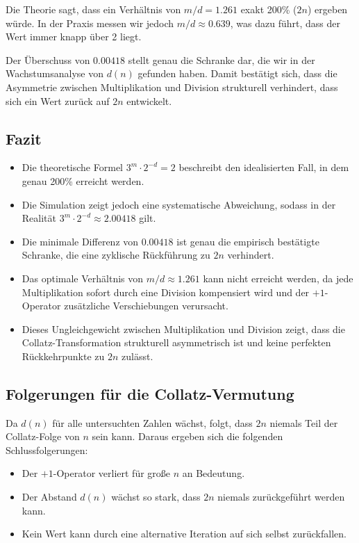 \documentclass[a4paper,12pt]{article}
\begin{document}
Die Theorie sagt, dass ein Verhältnis von \( m/d = 1.261 \) exakt 200\% (\( 2n \)) ergeben würde.  
In der Praxis messen wir jedoch \( m/d \approx 0.639 \), was dazu führt, dass der Wert immer knapp über 2 liegt.  

Der Überschuss von \( 0.00418 \) stellt genau die Schranke dar, die wir in der Wachstumsanalyse von \( d(n) \) gefunden haben. Damit bestätigt sich, dass die Asymmetrie zwischen Multiplikation und Division strukturell verhindert, dass sich ein Wert zurück auf \( 2n \) entwickelt.  

\subsection{Fazit}  

\begin{itemize}
    \item Die theoretische Formel \( 3^m \cdot 2^{-d} = 2 \) beschreibt den idealisierten Fall, in dem genau 200\% erreicht werden.  
    \item Die Simulation zeigt jedoch eine systematische Abweichung, sodass in der Realität \( 3^m \cdot 2^{-d} \approx 2.00418 \) gilt.  
    \item Die minimale Differenz von \( 0.00418 \) ist genau die empirisch bestätigte Schranke, die eine zyklische Rückführung zu \( 2n \) verhindert.  
    \item Das optimale Verhältnis von \( m/d \approx 1.261 \) kann nicht erreicht werden, da jede Multiplikation sofort durch eine Division kompensiert wird und der \( +1 \)-Operator zusätzliche Verschiebungen verursacht.  
    \item Dieses Ungleichgewicht zwischen Multiplikation und Division zeigt, dass die Collatz-Transformation strukturell asymmetrisch ist und keine perfekten Rückkehrpunkte zu \( 2n \) zulässt.  
\end{itemize}




\subsection{Folgerungen für die Collatz-Vermutung}

Da \( d(n) \) für alle untersuchten Zahlen wächst, folgt, dass \( 2n \) niemals Teil der Collatz-Folge von \( n \) sein kann. Daraus ergeben sich die folgenden Schlussfolgerungen:

\begin{itemize}
    \item Der \( +1 \)-Operator verliert für große \( n \) an Bedeutung.
    \item Der Abstand \( d(n) \) wächst so stark, dass \( 2n \) niemals zurückgeführt werden kann.
    \item Kein Wert kann durch eine alternative Iteration auf sich selbst zurückfallen.
\end{itemize}
\end{document}
